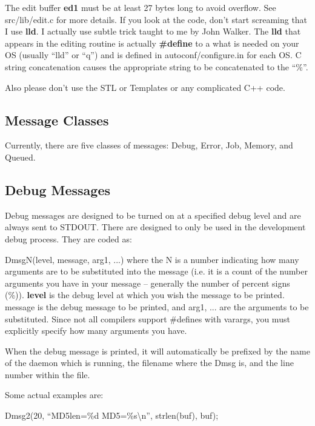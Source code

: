 The edit buffer {\bf ed1} must be at least 27 bytes long to avoid overflow.
See src/lib/edit.c for more details. If you look at the code, don't start
screaming that I use {\bf lld}. I actually use subtle trick taught to me by
John Walker. The {\bf lld} that appears in the editing routine is actually
{\bf \#define} to a what is needed on your OS (usually ``lld'' or ``q'') and
is defined in autoconf/configure.in for each OS. C string concatenation causes
the appropriate string to be concatenated to the ``\%''. 

Also please don't use the STL or Templates or any complicated C++ code. 

\subsection{Message Classes}

Currently, there are five classes of messages: Debug, Error, Job, Memory, 
and Queued.

\subsection{Debug Messages}

Debug messages are designed to be turned on at a specified debug level and are
always sent to STDOUT. There are designed to only be used in the development
debug process. They are coded as: 

DmsgN(level, message, arg1, ...) where the N is a number indicating how many
arguments are to be substituted into the message (i.e. it is a count of the
number arguments you have in your message -- generally the number of percent
signs (\%)). {\bf level} is the debug level at which you wish the message to
be printed. message is the debug message to be printed, and arg1, ... are the
arguments to be substituted. Since not all compilers support \#defines with
varargs, you must explicitly specify how many arguments you have. 

When the debug message is printed, it will automatically be prefixed by the
name of the daemon which is running, the filename where the Dmsg is, and the
line number within the file. 

Some actual examples are: 

Dmsg2(20, ``MD5len=\%d MD5=\%s\textbackslash{}n'', strlen(buf), buf); 

